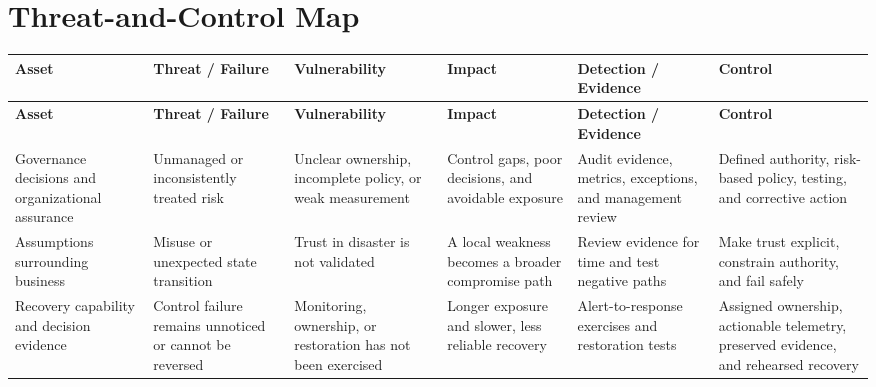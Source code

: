 \documentclass[11pt,letterpaper]{article}
\begin{document}
\section*{Threat-and-Control Map}
\begingroup\scriptsize\setlength{\tabcolsep}{2pt}
\begin{longtable}{>{\raggedright\arraybackslash}p{}>{\raggedright\arraybackslash}p{}>{\raggedright\arraybackslash}p{}>{\raggedright\arraybackslash}p{}>{\raggedright\arraybackslash}p{}>{\raggedright\arraybackslash}p{}}
\toprule\rowcolor{Navy}\color{white}\textbf{Asset} & \color{white}\textbf{Threat / Failure} & \color{white}\textbf{Vulnerability} & \color{white}\textbf{Impact} & \color{white}\textbf{Detection / Evidence} & \color{white}\textbf{Control}\\\midrule
\endfirsthead
\toprule\rowcolor{Navy}\color{white}\textbf{Asset} & \color{white}\textbf{Threat / Failure} & \color{white}\textbf{Vulnerability} & \color{white}\textbf{Impact} & \color{white}\textbf{Detection / Evidence} & \color{white}\textbf{Control}\\\midrule
\endhead
Governance decisions and organizational assurance & Unmanaged or inconsistently treated risk & Unclear ownership, incomplete policy, or weak measurement & Control gaps, poor decisions, and avoidable exposure & Audit evidence, metrics, exceptions, and management review & Defined authority, risk-based policy, testing, and corrective action\\\midrule
Assumptions surrounding business & Misuse or unexpected state transition & Trust in disaster is not validated & A local weakness becomes a broader compromise path & Review evidence for time and test negative paths & Make trust explicit, constrain authority, and fail safely\\\midrule
Recovery capability and decision evidence & Control failure remains unnoticed or cannot be reversed & Monitoring, ownership, or restoration has not been exercised & Longer exposure and slower, less reliable recovery & Alert-to-response exercises and restoration tests & Assigned ownership, actionable telemetry, preserved evidence, and rehearsed recovery\\\midrule
\bottomrule
\end{longtable}
\endgroup
\end{document}

